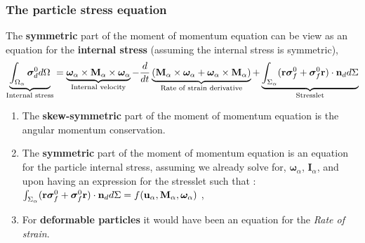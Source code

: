 \documentclass{sintefbeamer}
\begin{document}
\begin{frame}
  \frametitle{The particle stress equation }
  

The \textbf{symmetric} part of the moment of momentum equation can be view as an equation for the \textbf{internal stress} (assuming the internal stress is symmetric),  
\begin{equation*}
  \underbrace{\int_{\Omega_\alpha} \bm{\sigma}_d^0  d\Omega}_\text{Internal stress}
  = \underbrace{\bm\omega_\alpha\times\textbf{M}_\alpha\times\bm\omega_\alpha}_\text{Internal velocity}
  - \frac{d}{d t} \underbrace{(\textbf{M}_\alpha \times \bm\omega_\alpha+ \bm\omega_\alpha \times \textbf{M}_\alpha)}_\text{Rate of strain derivative}
  + \underbrace{\int_{\Sigma_\alpha}  (\textbf{r}\bm{\sigma}_f^0+\bm{\sigma}_f^0\textbf{r})\cdot \textbf{n}_d d\Sigma}_\text{Stresslet}
  \label{eq:dt_P_alpha}
\end{equation*}

\begin{enumerate}
  \item The \textbf{skew-symmetric} part of the moment of momentum equation is the angular momentum conservation. 
  \item The \textbf{symmetric} part of the moment of momentum equation is an equation  for the particle internal stress, assuming we already solve for, $\bm\omega_\alpha$, $\textbf{I}_\alpha$, and upon having an expression for the stresslet such that : $\int_{\Sigma_\alpha}  (\textbf{r}\bm{\sigma}_f^0+\bm{\sigma}_f^0\textbf{r})\cdot \textbf{n}_d d\Sigma = f(\textbf{u}_\alpha, \textbf{M}_\alpha,\bm\omega_\alpha)$ , 
  \item For \textbf{deformable particles} it would have been an equation for the \textit{Rate of strain}. 
\end{enumerate}



\end{frame}
\end{document}
